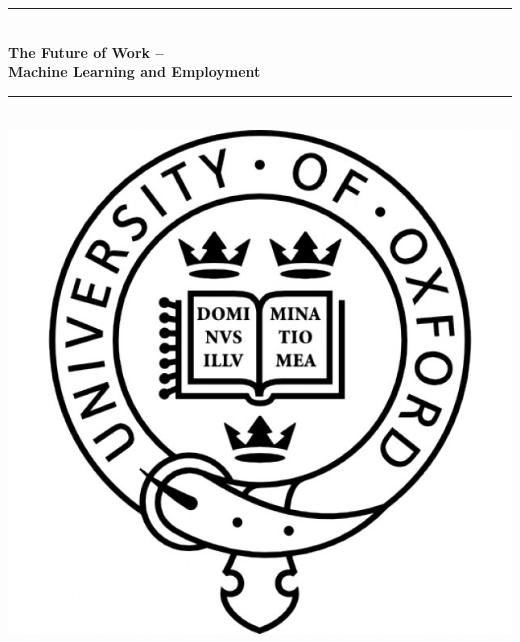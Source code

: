 \documentclass[11pt]{report}
\numberwithin{equation}{chapter}
\begin{document}
\begin{titlepage}

\newcommand{\HRule}{\rule{\linewidth}{0.5mm}} %

\center %
 


\HRule \\[0.4cm]
{ \huge \bfseries The Future of Work -- \\ Machine Learning and Employment}\\[0.4cm] %
\HRule \\[1.5cm]


\includegraphics[scale = 0.2]{logo.jpg}\\[1cm] %
 

\end{titlepage}
\end{document}
